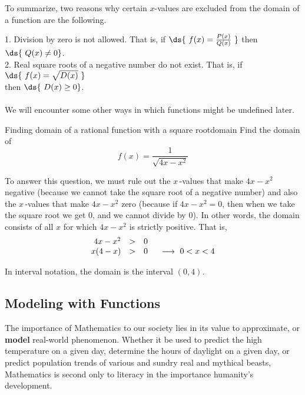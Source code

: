 To summarize, two reasons why certain $x$-values are excluded from the
domain of a function are the following.

\begin{formulabox}

1.  Division by zero is not allowed. That is, if $\ds{\,\,f(x)=\frac{P(x)}{Q(x)}\,\,}$ then $\ds{\,\, Q(x) \neq 0}$. \\
2.  Real square roots of a negative number do not exist. That is, if $\ds{\,\, f(x) = \sqrt{D(x)} \,\,}$ \\
then $\ds{\,\, D(x) \geq 0}$.  \\
\\
We will encounter some other ways in which functions might be undefined later.
\end{formulabox}

\begin{example}{Finding domain of a rational function with a square root}{domain}
	Find the domain of 
	$$f(x)={\frac{1}{\sqrt{4x-x^2}}}$$
	\vspace{-0.5cm}
\end{example}

\begin{solution} 
	To answer this question, we must rule out the $x\,$-values that make
	$4x-x^2$ negative (because we cannot take the square root of a
	negative number)
	and also the $x\,$-values that make $4x-x^2$ zero (because if $4x-x^2=0$, then
	when we take the square root we get 0, and we cannot divide by 0).
	In other words, the domain consists of all $x$ for which $4x-x^2$ is
	strictly positive.  That is, \\
	$$\begin{array}{rcl}
	4x-x^{2} & > & 0 \\
	x (4-x) & > & 0 \hspace{5mm} \longrightarrow \,\,0 < x < 4 \\
	\end{array}$$
	
	In interval notation, the domain is the interval $(0,4)$.
\end{solution}



\subsection{Modeling with Functions}\label{sec:ModelingFn}

The importance of Mathematics to our society lies in its value to approximate, or \textbf{model} real-world phenomenon.  Whether it be used to predict the high temperature on a given day, determine the hours of daylight on a given day, or predict population trends of various and sundry real and mythical beasts, Mathematics is second only to literacy in the importance humanity's development.

